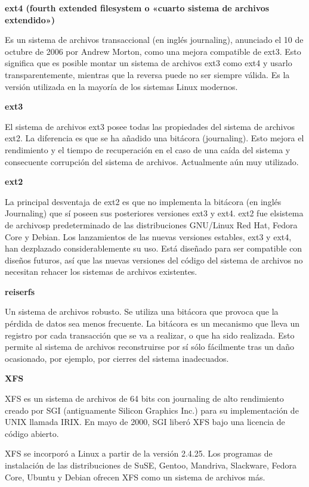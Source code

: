 \documentclass[12pt]{article}
\begin{document}
{\bf ext4 (fourth extended filesystem o «cuarto sistema de archivos 
extendido»)}

Es un sistema de archivos transaccional (en inglés journaling), anunciado 
el 10 de octubre de 2006 por Andrew Morton, como una mejora compatible de 
ext3. Esto significa que es posible montar un sistema de archivos ext3 como
ext4 y usarlo transparentemente, mientras que la reversa puede no ser 
siempre válida. Es la versión utilizada en la mayoría de los sistemas Linux
modernos. 

{\bf ext3}

    El sistema de archivos ext3 posee todas las propiedades del sistema de
archivos ext2. La diferencia es que se ha añadido una bitácora (journaling).
Esto mejora el rendimiento y el tiempo de recuperación en el caso de una 
caída del sistema y consecuente corrupción del sistema de archivos. 
Actualmente aún muy utilizado. 

{\bf ext2}

La principal desventaja de ext2 es que no implementa la bitácora (en inglés
Journaling) que sí poseen sus posteriores versiones ext3 y ext4. ext2 fue 
elsistema de archivosp predeterminado de las distribuciones GNU/Linux Red 
Hat, Fedora Core y Debian. Los lanzamientos de las nuevas versiones 
estables, ext3 y ext4, han dezplazado considerablemente su uso. Está 
diseñado para ser compatible con diseños futuros, así que las nuevas 
versiones del código del sistema de archivos no  necesitan rehacer los 
sistemas de archivos existentes.

{\bf reiserfs}

    Un sistema de archivos robusto. Se utiliza una bitácora que provoca
que la pérdida de datos sea menos frecuente. La bitácora es un mecanismo 
que lleva un registro por cada transacción que se va a realizar, o que ha 
sido realizada. Esto permite al sistema de archivos reconstruirse por sí 
sólo fácilmente tras un daño ocasionado, por ejemplo, por cierres del 
sistema inadecuados. 

{\bf XFS  }

XFS es un sistema de archivos de 64 bits con journaling de alto rendimiento
creado por SGI (antiguamente Silicon Graphics Inc.) para su implementación 
de UNIX llamada IRIX. En mayo de 2000, SGI liberó XFS bajo una licencia de 
código abierto. 

XFS se incorporó a Linux a partir de la versión 2.4.25. Los programas de 
instalación de las distribuciones de SuSE, Gentoo, Mandriva, Slackware, 
Fedora Core, Ubuntu y Debian ofrecen XFS como un sistema de archivos más.
\end{document}
